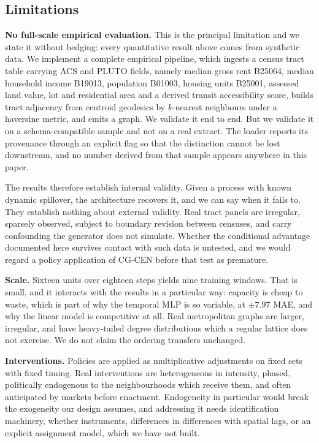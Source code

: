 \documentclass[journal]{IEEEtran}
\newcommand{\CGCEN}{CG\mbox{-}CEN}
\begin{document}
\subsection{Limitations}

\textbf{No full-scale empirical evaluation.} This is the principal limitation
and we state it without hedging: every quantitative result above comes from
synthetic data. We implement a complete empirical pipeline, which ingests a
census tract table carrying ACS and PLUTO fields, namely median gross rent
B25064, median household income B19013, population B01003, housing units B25001,
assessed land value, lot and residential area and a derived transit
accessibility score, builds tract adjacency from centroid geodesics by
$k$-nearest neighbours under a haversine metric, and emits a graph. We validate
it end to end. But we validate it on a schema-compatible sample and not on a
real extract. The loader reports its provenance through an explicit flag so that
the distinction cannot be lost downstream, and no number derived from that
sample appears anywhere in this paper.

The results therefore establish internal validity. Given a process with known
dynamic spillover, the architecture recovers it, and we can say when it fails
to. They establish nothing about external validity. Real tract panels are
irregular, sparsely observed, subject to boundary revision between censuses, and
carry confounding the generator does not simulate. Whether the conditional
advantage documented here survives contact with such data is untested, and we
would regard a policy application of \CGCEN{} before that test as premature.

\textbf{Scale.} Sixteen units over eighteen steps yields nine training windows.
That is small, and it interacts with the results in a particular way: capacity
is cheap to waste, which is part of why the temporal MLP is so variable, at
$\pm 7.97$ MAE, and why the linear model is competitive at all. Real
metropolitan graphs are larger, irregular, and have heavy-tailed degree
distributions which a regular lattice does not exercise. We do not claim the
ordering transfers unchanged.

\textbf{Interventions.} Policies are applied as multiplicative adjustments on
fixed sets with fixed timing. Real interventions are heterogeneous in intensity,
phased, politically endogenous to the neighbourhoods which receive them, and
often anticipated by markets before enactment. Endogeneity in particular would
break the exogeneity our design assumes, and addressing it needs identification
machinery, whether instruments, differences in differences with spatial lags, or
an explicit assignment model, which we have not built.
\end{document}
